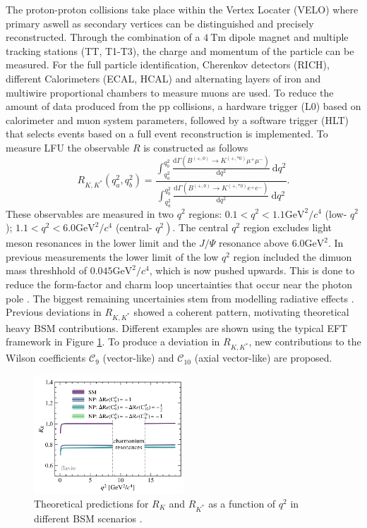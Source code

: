 \documentclass[%
 reprint,
 amsmath,amssymb,
 aps,
]{revtex4-2}
\begin{document}
The proton-proton collisions take place within the Vertex Locater (VELO) where primary aswell as secondary vertices can be distinguished and precisely reconstructed.
Through the combination of a $\SI{4}{\tesla\meter}$ dipole magnet and multiple tracking stations (TT, T1-T3), the charge and momentum of the particle can be measured.
For the full particle identification, Cherenkov detectors (RICH), different Calorimeters (ECAL, HCAL) and alternating layers of iron and multiwire proportional chambers to measure muons are used.
To reduce the amount of data produced from the pp collisions, a hardware trigger (L0) based on calorimeter and muon system parameters, followed by a software trigger (HLT) that selects events based on a full event reconstruction is implemented.
\newline
To measure LFU the observable $R$ is constructed as follows
\begin{equation}
    \label{eqn:1}
    R_{K, K^*}\left(q_a^2, q_b^2\right)=\frac{\int_{q_a^2}^{q_b^2} \frac{\mathrm{d} \Gamma\left(B^{(+, 0)} \rightarrow K^{(+, * 0)} \mu^{+} \mu^{-}\right)}{\mathrm{d} q^2} \mathrm{~d} q^2}{\int_{q_a^2}^{q_b^2} \frac{\mathrm{d} \Gamma\left(B^{(+, 0)} \rightarrow K^{(+, * 0)} e^{+} e^{-}\right)}{\mathrm{d} q^2} \mathrm{~d} q^2}.
\end{equation}
These observables are measured in two $q^2$ regions: $0.1<q^2<1.1 \mathrm{GeV}^2 / c^4$ (low- $q^2$); $1.1<q^2<6.0 \mathrm{GeV}^2 / c^4$ (central- $\left.q^2\right)$. 
The central $q^2$ region excludes light meson resonances in the lower limit and the $J/\Psi$ resonance above $6.0 \mathrm{GeV}^2$. In previous measurements the lower limit of the low $q^2$ region 
included the dimuon mass threshhold of $0.045 \mathrm{GeV}^2 / c^4$, which is now pushed upwards.
This is done to reduce the form-factor and charm loop uncertainties 
that occur near the photon pole \cite{Hiller_2004}.
The biggest remaining uncertainies stem from modelling radiative effects \cite{davidson2015photos}.
\\
Previous deviations in $R_{K, K^*}$ \cite{blhcb,Lees_2012} showed a coherent pattern, motivating theoretical heavy BSM contributions. Different examples are shown using the typical EFT framework in Figure \ref{fig:1}.
To produce a deviation in $R_{K, K^*}$, new contributions to the Wilson coefficients $\mathcal{C}_9$ (vector-like) and $\mathcal{C}_{10}$ (axial vector-like) are proposed.
\begin{figure}
    \centering
    \includegraphics[width=0.5\textwidth]{theory2.png}
    \caption{Theoretical predictions for $R_K$ and $R_{K^*}$ as a function of $q^2$ in different BSM scenarios \cite{lhcbcollaboration2022measurement}.}
    \label{fig:1}
\end{figure}
\end{document}
